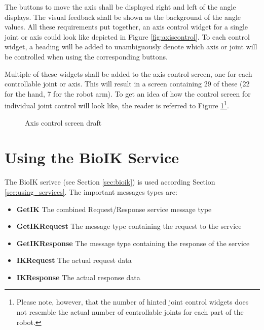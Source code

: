 The buttons to move the axis shall be displayed right and left of the angle displays. The visual feedback shall be shown as the background of the angle values. All these requirements put together, an axis control widget for a single joint or axis could look like depicted in Figure \ref{fig:axiscontrol}. To each control widget, a heading will be added to unambiguously denote which axis or joint will be controlled when using the corresponding buttons.

Multiple of these widgets shall be added to the axis control screen, one for each controllable joint or axis. This will result in a screen containing 29 of these (22 for the hand, 7 for the robot arm). To get an idea of how the control screen for individual joint control will look like, the reader is referred to Figure \ref{fig:axiscontrol:screen}\footnote{Please note, however, that the number of hinted joint control widgets does not resemble the actual number of controllable joints for each part of the robot.}. 

\begin{figure}
	\caption{\label{fig:axiscontrol:screen}Axis control screen draft}
\end{figure}

\section{Using the BioIK Service}
\label{sec:robotarm:ctrl}

The BioIK serivce (see Section \ref{sec:bioik}) is used according Section \ref{sec:using_services}. The important messages types are:
\begin{itemize}
	\item \textbf{GetIK} The combined Request/Response service message type
	\item \textbf{GetIKRequest} The message type containing the request to the service
	\item \textbf{GetIKResponse} The message type containing the response of the service
	\item \textbf{IKRequest} The actual request data
	\item \textbf{IKResponse} The actual response data
\end{itemize}

